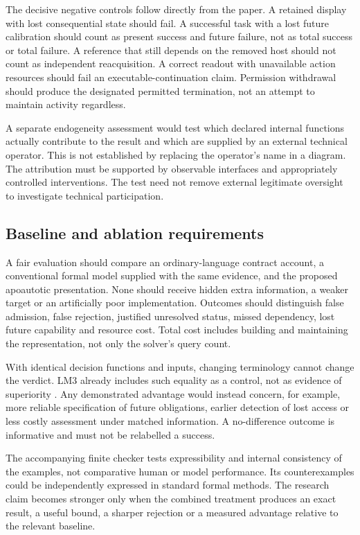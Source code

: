 The decisive negative controls follow directly from the paper. A retained display with lost consequential state should fail. A successful task with a lost future calibration should count as present success and future failure, not as total success or total failure. A reference that still depends on the removed host should not count as independent reacquisition. A correct readout with unavailable action resources should fail an executable-continuation claim. Permission withdrawal should produce the designated permitted termination, not an attempt to maintain activity regardless.

A separate endogeneity assessment would test which declared internal functions actually contribute to the result and which are supplied by an external technical operator. This is not established by replacing the operator's name in a diagram. The attribution must be supported by observable interfaces and appropriately controlled interventions. The test need not remove external legitimate oversight to investigate technical participation.

\subsection{Baseline and ablation requirements}

A fair evaluation should compare an ordinary-language contract account, a conventional formal model supplied with the same evidence, and the proposed apoautotic presentation. None should receive hidden extra information, a weaker target or an artificially poor implementation. Outcomes should distinguish false admission, false rejection, justified unresolved status, missed dependency, lost future capability and resource cost. Total cost includes building and maintaining the representation, not only the solver's query count.

With identical decision functions and inputs, changing terminology cannot change the verdict. LM3 already includes such equality as a control, not as evidence of superiority \cite[\S\S12.5,20.10]{LM3}. Any demonstrated advantage would instead concern, for example, more reliable specification of future obligations, earlier detection of lost access or less costly assessment under matched information. A no-difference outcome is informative and must not be relabelled a success.

The accompanying finite checker tests expressibility and internal consistency of the examples, not comparative human or model performance. Its counterexamples could be independently expressed in standard formal methods. The research claim becomes stronger only when the combined treatment produces an exact result, a useful bound, a sharper rejection or a measured advantage relative to the relevant baseline.

